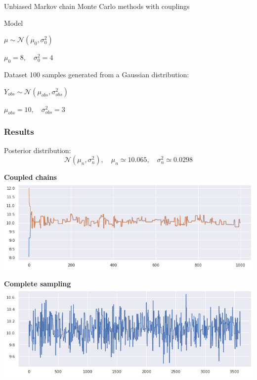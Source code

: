 \documentclass{beamer}
\begin{document}
\begin{section}{Unbiased Markov chain Monte Carlo methods with couplings}
\begin{frame}
\begin{block}{Model}
\begin{center}
				$ \mu  \sim \mathcal{N}(\mu_0, \sigma_0^2)$
				
				$\mu_0 = 8, \quad \sigma^2_0 = 4$
			\end{center}
		\end{block}
		
		\begin{block}{Dataset}
			100 samples generated from a Gaussian distribution:
			\begin{center}
				$
				Y_{obs} \sim \mathcal{N}(\mu_{obs}, \sigma_{obs} ^2)
				$
				
				$
				\mu_{obs} = 10, \quad
				\sigma_{obs} ^2 = 3
				$
			\end{center}
		\end{block}
	\end{frame}

	\begin{frame}
		\frametitle{Results}
		Posterior distribution:
		{\small
			$$
				\mathcal{N}(\mu_n, \sigma^2_n), 
				\quad
				\mu_n 
					\simeq 10.065,
				\quad
				\sigma^2_n
					\simeq 0.0298
		$$
		}
	
		\begin{minipage}{0.48\textwidth}
			\begin{center}
				{\scriptsize \textbf{Coupled chains} }
				\includegraphics[width=\textwidth]{immagini_coupling/2_catene_coupling}
			\end{center}
		\end{minipage}
		\hfill
		\begin{minipage}{0.48\textwidth}
			\begin{center}
				{\scriptsize \textbf{Complete sampling}}
				\includegraphics[width=\textwidth]{immagini_coupling/traceplot_coupling}
			\end{center}
		\end{minipage}
	

\end{frame}
\end{section}
\end{document}
